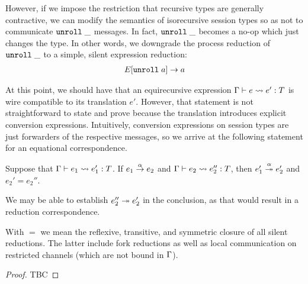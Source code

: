 However, if we impose the restriction that recursive types are
generally contractive, we can modify the semantics of isorecursive
session types so as not to communicate $\EUnroll\_$ messages. In fact,
$\EUnroll\_$ becomes a no-op which just changes the type. In other
words, we downgrade the process reduction of $\EUnroll\_$ to a simple,
silent expression reduction:
\begin{gather*}
  \reduce{E[\EUnroll a]}{a}
\end{gather*}

At this point, we should have that an equirecursive expression
$\translation e{e'} T$ is wire compatible to its translation
$e'$. However, that statement is not straightforward to state and
prove because the translation introduces explicit conversion
expressions. Intuitively, conversion expressions on session types are
just forwarders of the respective messages, so we arrive at the
following statement for an equational correspondence.

\begin{lemma}
  Suppose that $\translation {e_1}{e_1'} T$.
  If $\reduce[\alpha]{e_1}{e_2}$
  and $\translation{e_2}{e_2''}{T}$,
  then $\reducemany[\alpha]{e_1'}{e_2'}$
  and $e_2' = e_2''$.
\end{lemma}
We may be able to establish $\reducemany{e_2''}{e_2'}$ in  the
conclusion, as that would result in a reduction correspondence.

With $=$ we mean the reflexive, transitive, and symmetric closure of
all silent reductions. The latter include fork reductions as well as
local communication on restricted channels (which are not bound in
$\Ctxt$).
\begin{proof}
  TBC
\end{proof}

